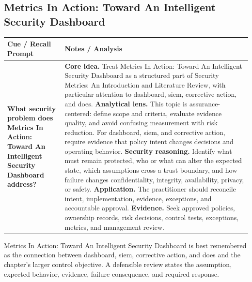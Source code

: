 \documentclass[11pt]{article}
\newcommand{\CornellHeader}{%
\rowcolor{Navy}\color{white}\bfseries Cue / Recall Prompt & \color{white}\bfseries Notes / Analysis\\\hline}
\newcommand{\CornellRow}[2]{%
\cellcolor{CueGray}\RaggedRight\textbf{#1} & \RaggedRight #2\\\hline}
\begin{document}
\subsection*{Metrics In Action: Toward An Intelligent Security Dashboard}
\begin{longtable}{>{\RaggedRight\arraybackslash}p{}|>{\RaggedRight\arraybackslash}p{}}
\CornellHeader
\CornellRow{What security problem does Metrics In Action: Toward An Intelligent Security Dashboard address?}{\textbf{Core idea.} Treat Metrics In Action: Toward An Intelligent Security Dashboard as a structured part of Security Metrics: An Introduction and Literature Review, with particular attention to dashboard, siem, corrective action, and does. \textbf{Analytical lens.} This topic is assurance-centered: define scope and criteria, evaluate evidence quality, and avoid confusing measurement with risk reduction. For dashboard, siem, and corrective action, require evidence that policy intent changes decisions and operating behavior. \textbf{Security reasoning.} Identify what must remain protected, who or what can alter the expected state, which assumptions cross a trust boundary, and how failure changes confidentiality, integrity, availability, privacy, or safety. \textbf{Application.} The practitioner should reconcile intent, implementation, evidence, exceptions, and accountable approval. \textbf{Evidence.} Seek approved policies, ownership records, risk decisions, control tests, exceptions, metrics, and management review.}
\end{longtable}
\begin{topicsummary}
Metrics In Action: Toward An Intelligent Security Dashboard is best remembered as the connection between dashboard, siem, corrective action, and does and the chapter's larger control objective. A defensible review states the assumption, expected behavior, evidence, failure consequence, and required response.
\end{topicsummary}
\end{document}
